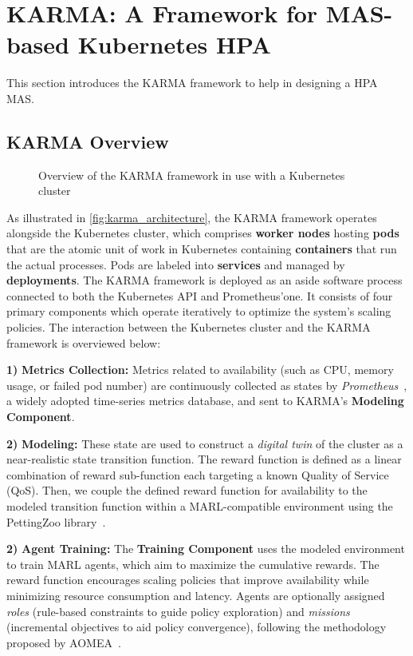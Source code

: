 \documentclass[conference]{IEEEtran}
\begin{document}
\section{KARMA: A Framework for MAS-based Kubernetes HPA}
\label{sec:proposed_approach}

This section introduces the KARMA framework to help in designing a HPA MAS.

\subsection{KARMA Overview}

\begin{figure}[h!]
    \centering
    
    \caption{Overview of the KARMA framework in use with a Kubernetes cluster}
    \label{fig:karma_architecture}
\end{figure}

As illustrated in \autoref{fig:karma_architecture}, the KARMA framework operates alongside the Kubernetes cluster, which comprises \textbf{worker nodes} hosting \textbf{pods} that are the atomic unit of work in Kubernetes containing \textbf{containers} that run the actual processes. Pods are labeled into \textbf{services} and managed by \textbf{deployments}.
%
The KARMA framework is deployed as an aside software process connected to both the Kubernetes API and Prometheus'one. It consists of four primary components which operate iteratively to optimize the system's scaling policies. The interaction between the Kubernetes cluster and the KARMA framework is overviewed below:

\textbf{1)} \textbf{Metrics Collection:} Metrics related to availability (such as CPU, memory usage, or failed pod number) are continuously collected as states by \textit{Prometheus}~\cite{prometheus}, a widely adopted time-series metrics database, and sent to KARMA's \textbf{Modeling Component}.

\textbf{2)} \textbf{Modeling:} These state are used to construct a \textit{digital twin} of the cluster as a near-realistic state transition function. The reward function is defined as a linear combination of reward sub-function each targeting a known Quality of Service (QoS). Then, we couple the defined reward function for availability to the modeled transition function within a MARL-compatible environment using the PettingZoo library~\cite{Terry2021}.

\textbf{2)} \textbf{Agent Training:} The \textbf{Training Component} uses the modeled environment to train MARL agents, which aim to maximize the cumulative rewards. The reward function encourages scaling policies that improve availability while minimizing resource consumption and latency. Agents are optionally assigned \textit{roles} (rule-based constraints to guide policy exploration) and \textit{missions} (incremental objectives to aid policy convergence), following the methodology proposed by AOMEA~\cite{soule2024aomea}.
    
\end{document}
